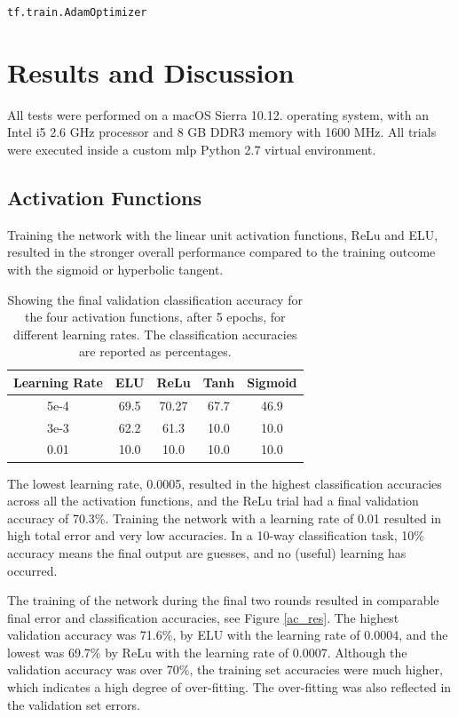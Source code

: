 \documentclass[]{article}
\begin{document}
\texttt{tf.train.AdamOptimizer}
 
\section{Results and Discussion}

All tests were performed on a macOS Sierra 10.12. operating system, with an Intel i5 2.6 GHz processor and 8 GB DDR3 memory with 1600 MHz. All trials were executed inside a custom mlp Python 2.7 virtual environment. 

\subsection{Activation Functions}

Training the network with the linear unit activation functions, ReLu and ELU, resulted in the stronger overall performance compared to the training outcome with the sigmoid or hyperbolic tangent. 

\begin{table}[h]
	\centering
	\caption{Showing the final validation classification accuracy  for the four activation functions, after 5 epochs, for different learning rates. The classification accuracies are reported as percentages.}
	\label{ac-table}
	\begin{tabular}{@{}c|cccc@{}}
		\toprule
		Learning Rate & ELU & ReLu & Tanh & Sigmoid \\ \midrule
		5e-4 & 69.5 & 70.27 & 67.7 & 46.9 \\
		3e-3 & 62.2 & 61.3 & 10.0 & 10.0 \\
		0.01 & 10.0 & 10.0 & 10.0 & 10.0 \\ \bottomrule
	\end{tabular}
\end{table}

The lowest learning rate, 0.0005, resulted in the highest classification accuracies across all the activation functions, and the ReLu trial had a final validation accuracy of 70.3\%. Training the network with a learning rate of 0.01 resulted in high total error and very low accuracies. In a 10-way classification task, 10\% accuracy means the final output are guesses, and no (useful) learning has occurred.

The training of the network during the final two rounds resulted in comparable final error and classification accuracies, see Figure \ref{ac_res}. The highest validation accuracy was 71.6\%, by ELU with the learning rate of 0.0004, and the lowest was 69.7\% by ReLu with the learning rate of 0.0007. Although the validation accuracy was over 70\%, the training set accuracies were much higher, which indicates a high degree of over-fitting. The over-fitting was also reflected in the validation set errors.
\end{document}
